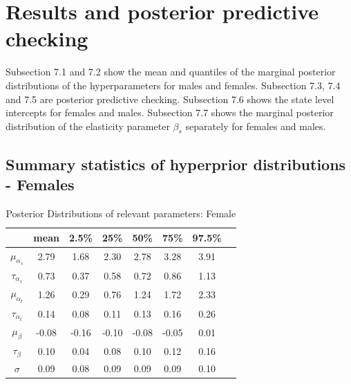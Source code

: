\documentclass{article}
\begin{document}
\newpage
\section{Results and posterior predictive checking}
Subsection 7.1 and 7.2 show the mean and quantiles of the marginal posterior distributions of the hyperparameters for males and females. Subsection 7.3, 7.4 and 7.5 are posterior predictive checking. Subsection 7.6 shows the state level intercepts for females and males. Subsection 7.7 shows the marginal posterior distribution of the elasticity parameter $\beta_s$ separately for females and males.
\subsection{Summary statistics of hyperprior distributions - Females}
\begin{table} [H]
\caption{Posterior Distributions of relevant parameters: Female}
\vspace{2mm}
\def\arraystretch{1}
\centering \begin{tabular}{c c c c c c c c} 
\hline\hline 
\vspace{1mm}
 & mean  & 2.5\%  &  25\% &   50\% &   75\% & 97.5\% &  \\  [0.5ex] \hline
$\mu_{\alpha_s}$ & 2.79 &  1.68 &  2.30 &  2.78 &  3.28  & 3.91   \\
$\tau_{\alpha_s}$  &  0.73  & 0.37  & 0.58 &  0.72 &  0.86 &  1.13    \\
$\mu_{\alpha_t}$ & 1.26  &  0.29  & 0.76 &  1.24  & 1.72  & 2.33      \\
$\tau_{\alpha_t}$ &  0.14  &  0.08  & 0.11 &  0.13  & 0.16  & 0.26   \\
$\mu_{\beta}$ &   -0.08   & -0.16  & -0.10 &  -0.08  & -0.05 &  0.01   \\
$\tau_{\beta}$ &  0.10  &  0.04 &  0.08 &   0.10 &  0.12  & 0.16  \\
$\sigma$ & 0.09 & 0.08 &  0.09 &  0.09  & 0.09 &  0.10 \\
\hline 
\end{tabular}
\end{table}
\end{document}
